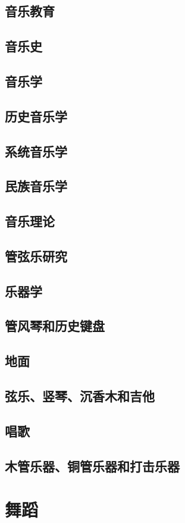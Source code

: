 \documentclass[UTF8]{../RepresentationUniverse}
\begin{document}
\section{音乐教育}
\section{音乐史}
\section{音乐学}
\section{历史音乐学}
\section{系统音乐学}
\section{民族音乐学}
\section{音乐理论}
\section{管弦乐研究}
\section{乐器学}
\section{管风琴和历史键盘}
\section{地面}
\section{弦乐、竖琴、沉香木和吉他}
\section{唱歌}
\section{木管乐器、铜管乐器和打击乐器}


\chapter{舞蹈}
\end{document}
